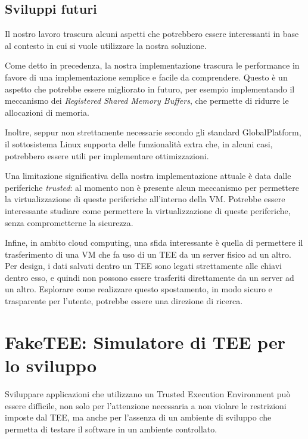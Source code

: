 \documentclass[12pt,italian]{report}
\begin{document}
\section{Sviluppi futuri}
\label{sec:sviluppi-futuri}
Il nostro lavoro trascura alcuni aspetti che potrebbero essere interessanti
in base al contesto in cui si vuole utilizzare la nostra soluzione.

Come detto in precedenza, la nostra implementazione trascura le performance in
favore di una implementazione semplice e facile da comprendere.
Questo è un aspetto che potrebbe essere migliorato in futuro, per esempio
implementando il meccanismo dei \textit{Registered Shared Memory Buffers},
che permette di ridurre le allocazioni di memoria.

Inoltre, seppur non strettamente necessarie secondo gli standard GlobalPlatform,
il sottosistema Linux supporta delle funzionalità extra che, in alcuni casi,
potrebbero essere utili per implementare ottimizzazioni.

\bigbreak \noindent

Una limitazione significativa della nostra implementazione attuale è data dalle
periferiche \textit{trusted}: al momento non è presente alcun meccanismo per
permettere la virtualizzazione di queste periferiche all'interno della VM.
Potrebbe essere interessante studiare come permettere la virtualizzazione
di queste periferiche, senza comprometterne la sicurezza.

\bigbreak \noindent

Infine, in ambito cloud computing, una sfida interessante è quella di permettere
il trasferimento di una VM che fa uso di un TEE da un server fisico ad un altro.
Per design, i dati salvati dentro un TEE sono legati strettamente alle chiavi
dentro esso, e quindi non possono essere trasferiti direttamente da un
server ad un altro.
Esplorare come realizzare questo spostamento,
in modo sicuro e trasparente per l'utente, potrebbe essere una direzione di ricerca.

\appendix
\chapter{FakeTEE: Simulatore di TEE per lo sviluppo}
\label{app:faketee}
Sviluppare applicazioni che utilizzano un Trusted Execution Environment può
essere difficile, non solo per l'attenzione necessaria a non violare
le restrizioni imposte dal TEE, ma anche per l'assenza di un ambiente di
sviluppo che permetta di testare il software in un ambiente controllato.
\end{document}

